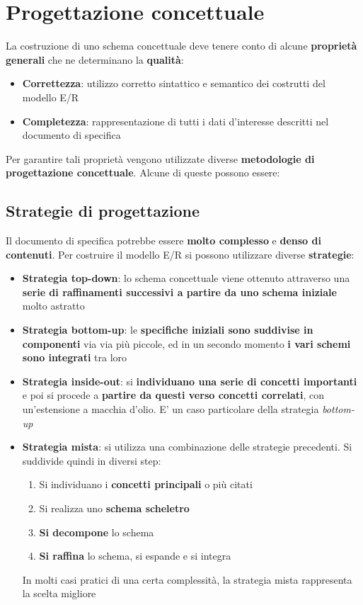 \documentclass{article}
\begin{document}
\pagestyle{empty}

\section*{Progettazione concettuale} 
\large

La costruzione di uno schema concettuale deve tenere conto di alcune \textbf{proprietà generali} che ne determinano la \textbf{qualità}:
\begin{itemize}[label={-}, leftmargin=1cm]
    \item \textbf{Correttezza}: utilizzo corretto sintattico e semantico dei costrutti del modello E/R
    \item \textbf{Completezza}: rappresentazione di tutti i dati d'interesse descritti nel documento di specifica
\end{itemize}
Per garantire tali proprietà vengono utilizzate diverse \textbf{metodologie di progettazione concettuale}. Alcune di queste possono essere:

\subsection*{Strategie di progettazione}
\large

Il documento di specifica potrebbe essere \textbf{molto complesso} e \textbf{denso di contenuti}. Per costruire il modello E/R si possono utilizzare diverse \textbf{strategie}:
\begin{itemize}[label={-}, leftmargin=1cm]
    \item \textbf{Strategia top-down}: lo schema concettuale viene ottenuto attraverso una \textbf{serie di raffinamenti successivi a partire da uno schema iniziale} molto astratto
    \item \textbf{Strategia bottom-up}: le \textbf{specifiche iniziali sono suddivise in componenti} via via più piccole, ed in un secondo momento \textbf{i vari schemi sono integrati} tra loro
    \item \textbf{Strategia inside-out}: si \textbf{individuano una serie di concetti importanti} e poi si procede a \textbf{partire da questi verso concetti correlati}, con un'estensione a macchia d'olio. E' un caso particolare della strategia \textit{bottom-up}
    \item \textbf{Strategia mista}: si utilizza una combinazione delle strategie precedenti. Si suddivide quindi in diversi step:
    \begin{enumerate}[leftmargin=1cm]
        \item Si individuano i \textbf{concetti principali} o più citati
        \item Si realizza uno \textbf{schema scheletro}
        \item \textbf{Si decompone} lo schema
        \item \textbf{Si raffina} lo schema, si espande e si integra
    \end{enumerate}
    In molti casi pratici di una certa complessità, la strategia mista rappresenta la scelta migliore
\end{itemize}
\end{document}
